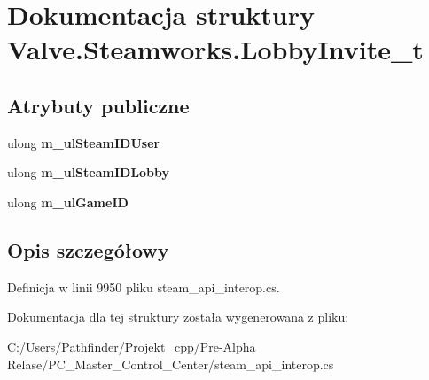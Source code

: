 \hypertarget{struct_valve_1_1_steamworks_1_1_lobby_invite__t}{}\section{Dokumentacja struktury Valve.\+Steamworks.\+Lobby\+Invite\+\_\+t}
\label{struct_valve_1_1_steamworks_1_1_lobby_invite__t}
\subsection*{Atrybuty publiczne}
\begin{DoxyCompactItemize}
\item 
\mbox{\label{struct_valve_1_1_steamworks_1_1_lobby_invite__t_a866f73d99ca204111003f283eb065a4b}} 
ulong {\bfseries m\+\_\+ul\+Steam\+I\+D\+User}
\item 
\mbox{\label{struct_valve_1_1_steamworks_1_1_lobby_invite__t_a603ba13cfd9eb3b479fcef11fc84c894}} 
ulong {\bfseries m\+\_\+ul\+Steam\+I\+D\+Lobby}
\item 
\mbox{\label{struct_valve_1_1_steamworks_1_1_lobby_invite__t_accd8704af176195d956cfffcb39bf43e}} 
ulong {\bfseries m\+\_\+ul\+Game\+ID}
\end{DoxyCompactItemize}


\subsection{Opis szczegółowy}


Definicja w linii 9950 pliku steam\+\_\+api\+\_\+interop.\+cs.



Dokumentacja dla tej struktury została wygenerowana z pliku\+:\begin{DoxyCompactItemize}
\item 
C\+:/\+Users/\+Pathfinder/\+Projekt\+\_\+cpp/\+Pre-\/\+Alpha Relase/\+P\+C\+\_\+\+Master\+\_\+\+Control\+\_\+\+Center/steam\+\_\+api\+\_\+interop.\+cs\end{DoxyCompactItemize}
